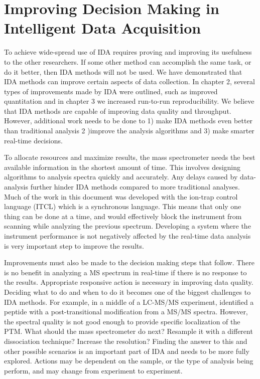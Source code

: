 \section{Improving Decision Making in Intelligent Data Acquisition}

To achieve wide-spread use of IDA requires proving and improving its usefulness to the other researchers. If some other method can accomplish the same task, or do it better, then IDA methods will not be used. We have demonstrated that IDA methods can improve certain aspects of data collection. In chapter 2, several types of improvements made by IDA were outlined, such as improved quantitation and in chapter 3 we increased run-to-run reproducibility. We believe that IDA methods are capable of improving data quality and throughput. However, additional work needs to be done to 1) make IDA methods even better than traditional analysis 2 )improve the analysis algorithms and 3) make smarter real-time decisions.

To allocate resources and maximize results, the mass spectrometer needs the best available information in the shortest amount of time. This involves designing algorithms to analysis spectra quickly and accurately. Any delays caused by data-analysis further hinder IDA methods compared to more traditional analyses. Much of the work in this document was developed with the ion-trap control language (ITCL) which is a synchronous language. This means that only one thing can be done at a time, and would effectively block the instrument from scanning while analyzing the previous spectrum. Developing a system where the instrument performance is not negatively affected by the real-time data analysis is very important step to improve the results.

Improvements must also be made to the decision making steps that follow. There is no benefit in analyzing a MS spectrum in real-time if there is no response to the results. Appropriate responsive action is necessary in improving data quality. Deciding what to do and when to do it becomes one of the biggest challenges to IDA methods. For example, in a middle of a LC-MS/MS experiment, \inseq{} identified a peptide with a post-transitional modification from a MS/MS spectra. However, the spectral quality is not good enough to provide specific localization of the PTM. What should the mass spectrometer do next? Resample it with a different dissociation technique? Increase the resolution? Finding the answer to this and other possible scenarios is an important part of IDA and needs to be more fully explored. Actions may be dependent on the sample, or the type of analysis being perform, and may change from experiment to experiment. 

